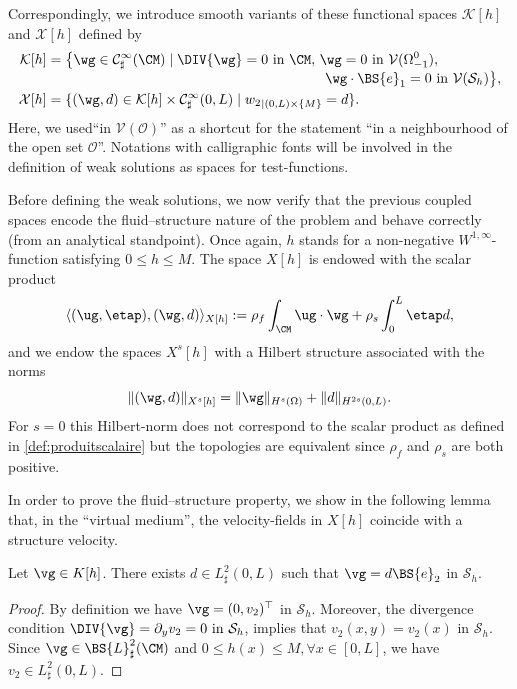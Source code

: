 Correspondingly, we introduce smooth variants of these functional spaces $\mathcal{K}[h]$ and $\mathcal{X}[h]$ defined by
\begin{align}
\mathcal{K}[h]&=\bigl\{\wg\in\mathcal{C}^{\infty}_{\sharp}(\CM)\mid \DIV{\wg}=0\text{ in }\CM,\,\wg=0\text{ in }\mathcal{V}(\Omega_{-1}^{0}),\\[-3pt]
&\hspace*{7cm}\wg\cdot\BS{e}_{1}=0\text{ in } \mathcal V(\mathcal{S}_{h})\bigl\},\notag\\
\mathcal{X}[h]&=\{(\wg,d)\in \mathcal{K}[h]\times \mathcal{C}^{\infty}_{\sharp}(0,L)\mid {w_{2}}_{|{(0, L)\times \{M\}}}=d\}.
\end{align}
Here, we used``in $\mathcal{V}(\mathcal O)$'' as a shortcut for the statement ``in a neighbourhood of the open set $\mathcal O$''.
Notations with calligraphic fonts will be involved in the definition of weak solutions as spaces for test-functions.

Before defining the weak solutions, we now verify that the previous coupled spaces encode
the fluid--structure nature of the problem and behave correctly (from an analytical standpoint).
Once again, $h$ stands for a non-negative $W^{1, \infty}$-function satisfying $0\leq h \leq M$.
The space $X[h]$ is endowed with the scalar product\vspace*{-3pt}
\begin{equation}
\label{def:produitscalaire}
\langle (\ug,\etap),(\wg,d)\rangle_{X[h]}:=\rho_{f}\int_{\CM}\ug\cdot\wg + \rho_{s}\int_{0}^{L}\etap d,\end{equation}
and we endow the spaces $X^s[h]$ with a Hilbert structure associated with the norms\vspace*{-3pt}\enlargethispage{.5\baselineskip}%
\[
\|(\wg,d)\|_{X^s[h]}= \|\wg\|_{H^s(\Omega)} + \|d\|_{H^{2s}(0,L)}.
\]
For $s=0$ this Hilbert-norm does not correspond to the scalar product as defined in \eqref{def:produitscalaire}
but the topologies are equivalent since $\rho_f$ and $\rho_s$ are both positive.

In order to prove the fluid--structure property, we show in the following lemma that,
in the ``virtual medium'', the velocity-fields in $X[h]$ coincide with a structure velocity.
\begin{lemma}Let $\vg \in K[h]$. There exists $d\in L_{\sharp}^{2}(0,L)$ such that $\vg=d\BS{e}_{2}$ in $\mathcal{S}_{h}$. \end{lemma}
\begin{proof}
By definition we have $\vg=(0,v_{2})^{\top}$ in $\mathcal{S}_{h}$. Moreover, the divergence condition
$\DIV{\vg}=\partial_yv_{2}=0\text{ in }\mathcal{S}_{h}$,
implies that $v_{2}(x,y)=v_{2}(x)$ in $\mathcal{S}_{h}$. Since $\vg\in \BS{L}^2_\sharp(\CM)$ and $0\leq h(x) \leq M, \forall x\in [0, L]$, we have $v_2\in L_\sharp^2(0, L)$.
\end{proof}

